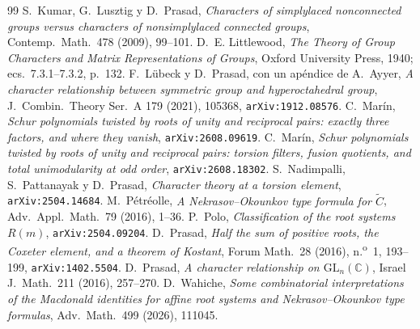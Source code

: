 \documentclass[11pt,a4paper]{article}
\newcommand{\GL}{\mathrm{GL}}
\begin{document}
\begin{thebibliography}{99}
 S.~Kumar, G.~Lusztig y D.~Prasad, \emph{Characters of simplylaced nonconnected
groups versus characters of nonsimplylaced connected groups}, Contemp.~Math.~478 (2009), 99--101.
 D.~E. Littlewood, \emph{The Theory of Group Characters and Matrix Representations of
Groups}, Oxford University Press, 1940; ecs.~7.3.1--7.3.2, p.~132.
 F.~Lübeck y D.~Prasad, con un apéndice de A.~Ayyer, \emph{A character
relationship between symmetric group and hyperoctahedral group}, J.~Combin.~Theory Ser.~A 179
(2021), 105368, \texttt{arXiv:1912.08576}.
 C.~Mar\'in, \emph{Schur polynomials twisted by roots of unity and reciprocal pairs:
exactly three factors, and where they vanish}, \texttt{arXiv:2608.09619}.
 C.~Mar\'in, \emph{Schur polynomials twisted by roots of unity and reciprocal pairs:
torsion filters, fusion quotients, and total unimodularity at odd order},
\texttt{arXiv:2608.18302}.
 S.~Nadimpalli, S.~Pattanayak y D.~Prasad, \emph{Character theory at a torsion
element}, \texttt{arXiv:2504.14684}.
 M.~Pétréolle, \emph{A Nekrasov--Okounkov type formula for
$\widetilde{C}$}, Adv.~Appl.~Math.~79 (2016), 1--36.
 P.~Polo, \emph{Classification of the root systems $R(m)$},
\texttt{arXiv:2504.09204}.
 D.~Prasad, \emph{Half the sum of positive roots, the Coxeter element, and a
theorem of Kostant}, Forum Math.~28 (2016), n.\textsuperscript{o}~1, 193--199, \texttt{arXiv:1402.5504}.
 D.~Prasad, \emph{A character relationship on $\GL_n(\mathbb{C})$},
Israel J.~Math.~211 (2016), 257--270.
 D.~Wahiche, \emph{Some combinatorial interpretations of the Macdonald identities
for affine root systems and Nekrasov--Okounkov type formulas}, Adv.~Math.~499 (2026), 111045.
\end{thebibliography}
\end{document}
